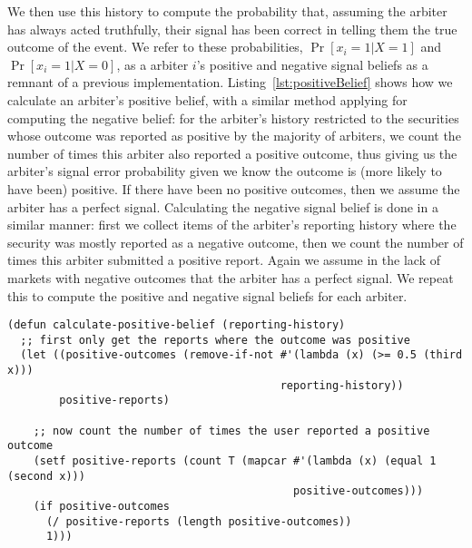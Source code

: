 We then use this history to compute the probability that, assuming the arbiter
has always acted truthfully, their signal has been correct in telling them the
true outcome of the event. We refer to these probabilities, $\Pr[x_i=1|X=1]$
and $\Pr[x_i=1|X=0]$, as a arbiter $i$'s positive and negative signal beliefs
as a remnant of a previous implementation. Listing~\ref{lst:positiveBelief}
shows how we calculate an arbiter's positive belief, with a similar method
applying for computing the negative belief: for the arbiter's history
restricted to the securities whose outcome was reported as positive by the
majority of arbiters, we count the number of times this arbiter also reported a
positive outcome, thus giving us the arbiter's signal error probability given
we know the outcome is (more likely to have been) positive. If there have been
no positive outcomes, then we assume the arbiter has a perfect signal.
Calculating the negative signal belief is done in a similar manner: first we
collect items of the arbiter's reporting history where the security was mostly
reported as a negative outcome, then we count the number of times this arbiter
submitted a positive report. Again we assume in the lack of markets with
negative outcomes that the arbiter has a perfect signal. We repeat this to
compute the positive and negative signal beliefs for each arbiter.

\begin{lstlisting}[float,
	label={lst:positiveBelief},
	caption={Computing an arbiter's positive signal belief given
	their reporting history}]
(defun calculate-positive-belief (reporting-history)
  ;; first only get the reports where the outcome was positive
  (let ((positive-outcomes (remove-if-not #'(lambda (x) (>= 0.5 (third x)))
                                          reporting-history))
        positive-reports)

    ;; now count the number of times the user reported a positive outcome
    (setf positive-reports (count T (mapcar #'(lambda (x) (equal 1 (second x)))
                                            positive-outcomes)))
    (if positive-outcomes
      (/ positive-reports (length positive-outcomes))
      1)))
\end{lstlisting}

